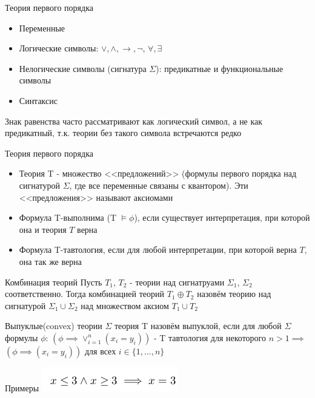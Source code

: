 \documentclass{beamer}
\begin{document}
\begin{frame}{Теория первого порядка}
\begin{itemize}
\item Переменные
\item Логические символы: $\vee, \wedge, \rightarrow, \lnot$, $\forall, \exists$
\item Нелогические символы (сигнатура $\Sigma$): предикатные и функциональные символы
\item Синтаксис
\end{itemize}
Знак равенства часто рассматривают как логический символ, а не как предикатный, т.к. теории без такого символа встречаются редко
\end{frame}

\begin{frame}{Теория первого порядка}
\begin{itemize}
\item Теория T - множество <<предложений>> (формулы первого порядка над сигнатурой $\Sigma$, где все переменные связаны с
квантором). Эти <<предложения>> называют аксиомами
\item Формула T-выполнима (T $\vDash \phi$), если существует интерпретация, при которой она и теория $T$ верна
\item Формула T-тавтология, если для любой интерпретации, при которой верна $T$, она так же верна
\end{itemize}
\end{frame}

\begin{frame}{Комбинация теорий}
Пусть $T_1$, $T_2$ - теории над сигнатруами $\Sigma_1$, $\Sigma_2$ соответственно. Тогда комбинацией теорий $T_1 \oplus T_2$
назовём теорию над сигнатурой $\Sigma_1 \cup \Sigma_2$ над множеством аксиом $T_1 \cup T_2$
\end{frame}

\begin{frame}{Выпуклые(convex) теории}
$\Sigma$ теория T назовём выпуклой, если для любой $\Sigma$ формулы $\phi$:\newline
$(\phi \implies \vee_{i=1}^{n}(x_i=y_i))$ - T тавтология для некоторого $n > 1 \implies$\newline
$(\phi \implies (x_i=y_i))$ для всех $i \in \{1, \dots, n\}$
\end{frame}

\begin{frame}{Примеры}
\includegraphics[scale=0.5]{convex.png}\newline
\end{frame}
\end{document}
